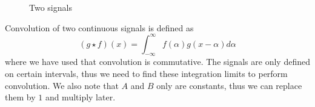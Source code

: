 \documentclass[a4paper, 10pt, final]{article}
\begin{document}
\begin{figure}[!h]
    \centering
    \hspace{1em}
    \caption{Two signals}
    \label{signals}
\end{figure}

Convolution of two continuous signals is defined as
\begin{equation}
    (g \star f)(x) = \int_{-\infty}^{\infty}{f(\alpha)g(x - \alpha)d\alpha}
\end{equation}
where we have used that convolution is commutative. The signals are only
defined on certain intervals, thus we need to find these integration
limits to perform convolution. We also note that $A$ and $B$ only are
constants, thus we can replace them by $1$ and multiply later.
\end{document}
